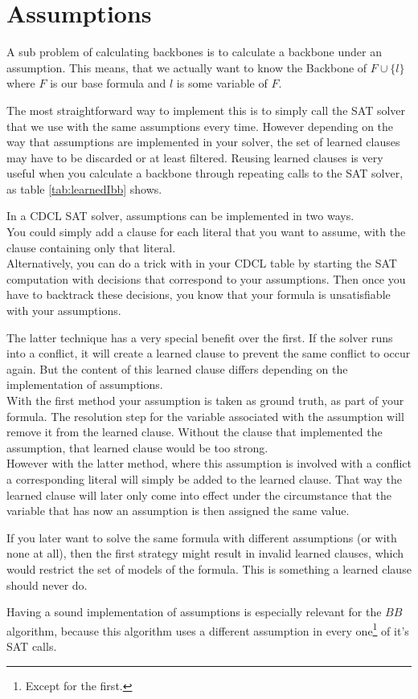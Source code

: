 \section{Assumptions}

A sub problem of calculating backbones is to calculate a backbone under an assumption. This means, that we actually want to know the Backbone of $F \cup\{l\}$ where $F$ is our base formula and $l$ is some variable of $F$.

The most straightforward way to implement this is to simply call the SAT solver that we use with the same assumptions every time. However depending on the way that assumptions are implemented in your solver, the set of learned clauses may have to be discarded or at least filtered. Reusing learned clauses is very useful when you calculate a backbone through repeating calls to the SAT solver, as table \ref{tab:learnedIbb} shows.

In a CDCL SAT solver, assumptions can be implemented in two ways. \\
You could simply add a clause for each literal that you want to assume, with the clause containing only that literal. \\
Alternatively, you can do a trick with in your CDCL table by starting the SAT computation with decisions that correspond to your assumptions. Then once you have to backtrack these decisions, you know that your formula is unsatisfiable with your assumptions.

The latter technique has a very special benefit over the first. If the solver runs into a conflict, it will create a learned clause to prevent the same conflict to occur again. But the content of this learned clause differs depending on the implementation of assumptions.\\
With the first method your assumption is taken as ground truth, as part of your formula. The resolution step for the variable associated with the assumption will remove it from the learned clause. Without the clause that implemented the assumption, that learned clause would be too strong.\\
However with the latter method, where this assumption is involved with a conflict a corresponding literal will simply be added to the learned clause. That way the learned clause will later only come into effect under the circumstance that the variable that has now an assumption is then assigned the same value.

If you later want to solve the same formula with different assumptions (or with none at all), then the first strategy might result in invalid learned clauses, which would restrict the set of models of the formula. This is something a learned clause should never do.

Having a sound implementation of assumptions is especially relevant for the $BB$ algorithm, because this algorithm uses a different assumption in every one\footnote{Except for the first.} of it's SAT calls.